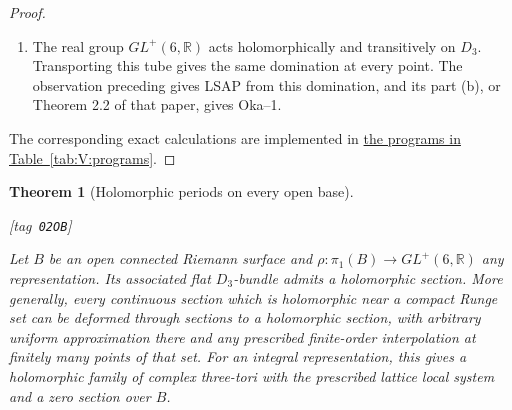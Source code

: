 \documentclass[11pt,a4paper]{article}
\numberwithin{equation}{section}
\newtheorem{theorem}{Theorem}[section]
\theoremstyle{definition}
\newcommand{\StatementRecord}[4]{{\upshape\footnotesize[tag~\texttt{#3}]}\enspace\ignorespaces}
\begin{document}
\begin{proof}
\begin{enumerate}[label=\arabic*.]
\item The real group $GL^+(6,\mathbb R)$ acts holomorphically and
transitively on $D_3$.  Transporting this tube gives the same
domination at every point.  The observation preceding
\cite[arXiv v5, Proposition~7.13 and preceding paragraph, pp.~23--24; Theorem~2.2, p.~5]{IVVOkaOneV5} gives LSAP from
this domination, and its part (b), or Theorem 2.2 of that paper,
gives Oka--1.

\end{enumerate}
The corresponding exact calculations are implemented in \hyperlink{prog:V:tubes}{the programs in Table~\ref*{tab:V:programs}}.
\end{proof}




\begin{theorem}[Holomorphic periods on every open base]\hypertarget{tag-02OB}{}\label{maps:src:F.3.9}
\StatementRecord{maps:src:F.3.9}{proved}{02OB}{\cref{maps:src:F.3.8}; \cite[Proposition 7.13(d), p.~24]{IVVOkaOneV5}}


Let $B$ be an open connected Riemann surface and
$\rho:\pi_1(B)\to GL^+(6,\mathbb R)$ any representation.
Its associated flat $D_3$-bundle admits a holomorphic section.
More generally, every continuous section which is holomorphic
near a compact Runge set can be deformed through sections to a
holomorphic section, with arbitrary uniform approximation there
and any prescribed finite-order interpolation at finitely many
points of that set.  For an integral representation, this gives
a holomorphic family of complex three-tori with the prescribed
lattice local system and a zero section over $B$.

\end{theorem}
\end{document}
